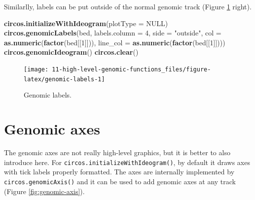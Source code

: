 \documentclass[]{book}
\newenvironment{Shaded}{\begin{snugshade}}{\end{snugshade}}
\newcommand{\KeywordTok}[1]{\textcolor[rgb]{0.13,0.29,0.53}{\textbf{#1}}}
\newcommand{\DataTypeTok}[1]{\textcolor[rgb]{0.13,0.29,0.53}{#1}}
\newcommand{\DecValTok}[1]{\textcolor[rgb]{0.00,0.00,0.81}{#1}}
\newcommand{\StringTok}[1]{\textcolor[rgb]{0.31,0.60,0.02}{#1}}
\newcommand{\OtherTok}[1]{\textcolor[rgb]{0.56,0.35,0.01}{#1}}
\newcommand{\NormalTok}[1]{#1}
\begin{document}
Similarlly, labels can be put outside of the normal genomic track
(Figure \ref{fig:genomic-labels} right).

\begin{Shaded}
\begin{Highlighting}[]
\KeywordTok{circos.initializeWithIdeogram}\NormalTok{(}\DataTypeTok{plotType =} \OtherTok{NULL}\NormalTok{)}
\KeywordTok{circos.genomicLabels}\NormalTok{(bed, }\DataTypeTok{labels.column =} \DecValTok{4}\NormalTok{, }\DataTypeTok{side =} \StringTok{"outside"}\NormalTok{,}
    \DataTypeTok{col =} \KeywordTok{as.numeric}\NormalTok{(}\KeywordTok{factor}\NormalTok{(bed[[}\DecValTok{1}\NormalTok{]])), }\DataTypeTok{line_col =} \KeywordTok{as.numeric}\NormalTok{(}\KeywordTok{factor}\NormalTok{(bed[[}\DecValTok{1}\NormalTok{]])))}
\KeywordTok{circos.genomicIdeogram}\NormalTok{()}
\KeywordTok{circos.clear}\NormalTok{()}
\end{Highlighting}
\end{Shaded}

\begin{figure}

{\centering \texttt{[image: 11-high-level-genomic-functions\_files/figure-latex/genomic-labels-1]} 

}

\caption{Genomic labels.}\label{fig:genomic-labels}
\end{figure}

\section{Genomic axes}\label{genomic-axes}

The genomic axes are not really high-level graphics, but it is better to
also introduce here. For \texttt{circos.initializeWithIdeogram()}, by
default it draws axes with tick labels properly formatted. The axes are
internally implemented by \texttt{circos.genomicAxis()} and it can be
used to add genomic axes at any track (Figure \ref{fig:genomic-axis}).
\end{document}
